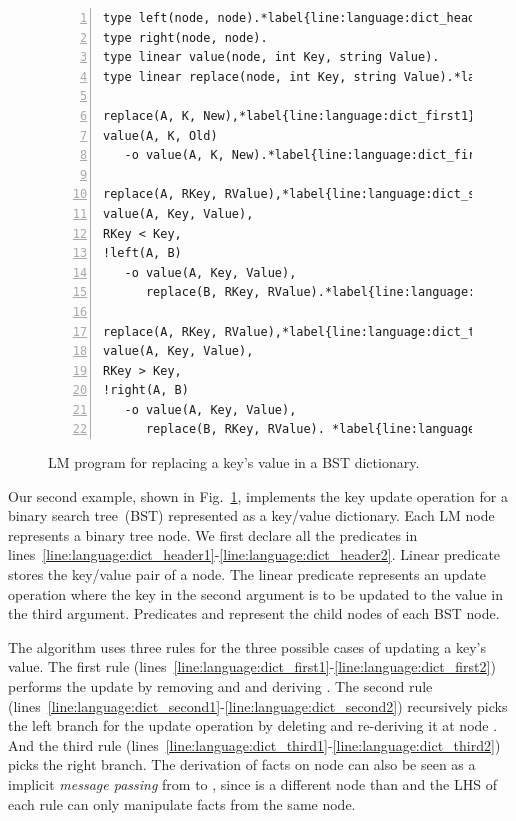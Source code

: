 
\begin{figure}[ht]
\begin{Verbatim}[numbers=left,fontsize=\codesize,commandchars=\*\{\}]
type left(node, node).*label{line:language:dict_header1}*hfill // Predicate declaration
type right(node, node).
type linear value(node, int Key, string Value).
type linear replace(node, int Key, string Value).*label{line:language:dict_header2}

replace(A, K, New),*label{line:language:dict_first1}*hfill// Rule 1: we found our key
value(A, K, Old)
   -o value(A, K, New).*label{line:language:dict_first2}

replace(A, RKey, RValue),*label{line:language:dict_second1}*hfill// Rule 2: go left
value(A, Key, Value),
RKey < Key,
!left(A, B)
   -o value(A, Key, Value),
      replace(B, RKey, RValue).*label{line:language:dict_second2}

replace(A, RKey, RValue),*label{line:language:dict_third1}*hfill// Rule 3: go right
value(A, Key, Value),
RKey > Key,
!right(A, B)
   -o value(A, Key, Value),
      replace(B, RKey, RValue). *label{line:language:dict_third2}
\end{Verbatim}
\caption{LM program for replacing a key's value in a BST dictionary.}
\label{code:language:btree_replace}
\end{figure}

Our second example, shown in Fig.~\ref{code:language:btree_replace}, implements
the key update operation for a binary search tree~(BST) represented as a
key/value dictionary. Each LM node represents a binary tree node. We first
declare all the predicates in
lines~\ref{line:language:dict_header1}-\ref{line:language:dict_header2}.  Linear
predicate  stores the key/value pair of a node. The linear predicate
 represents an update operation where the key in the second
argument is to be updated to the value in the third argument. Predicates
 and  represent the child nodes of each BST node.

The algorithm uses three rules for the three possible cases of updating a key's
value. The first rule
(lines~\ref{line:language:dict_first1}-\ref{line:language:dict_first2}) performs
the update by removing  and  and
deriving . The second rule
(lines~\ref{line:language:dict_second1}-\ref{line:language:dict_second2})
recursively picks the left branch for the update operation by deleting
 and re-deriving it at node . And the
third rule
(lines~\ref{line:language:dict_third1}-\ref{line:language:dict_third2}) picks
the right branch. The derivation of  facts on node  can
also be seen as a implicit \emph{message passing} from  to ,
since  is a different node than  and the LHS of each rule can
only manipulate facts from the same node.

